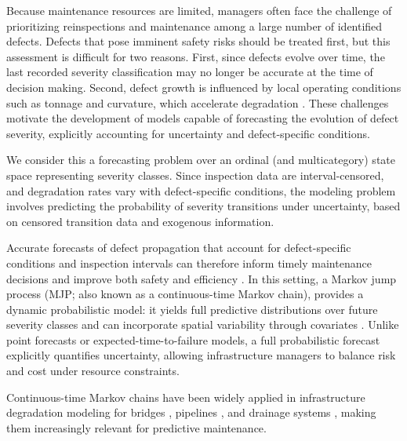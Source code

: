 Because maintenance resources are limited, managers often face the challenge of prioritizing reinspections and maintenance among a large number of identified defects.
Defects that pose imminent safety risks should be treated first, but this assessment is difficult for two reasons. 
First, since defects evolve over time, the last recorded severity classification may no longer be accurate at the time of decision making.
Second, defect growth is influenced by local operating conditions such as tonnage and curvature, which accelerate degradation \citep{bai2017a,Kumar2008HolisticSweden}.
These challenges motivate the development of models capable of forecasting the evolution of defect severity, explicitly accounting for uncertainty and defect-specific conditions.

We consider this a forecasting problem over an ordinal (and multicategory) state space representing severity classes. Since inspection data are interval-censored, and degradation rates vary with defect-specific conditions, the modeling problem involves predicting the probability of severity transitions under uncertainty, based on censored transition data and exogenous information.

Accurate forecasts of defect propagation that account for defect-specific conditions and inspection intervals can therefore inform timely maintenance decisions and improve both safety and efficiency \citep{Binder2023}. In this setting, a Markov jump process (MJP; also known as a continuous-time Markov chain), provides a dynamic probabilistic model: it yields full predictive distributions over future severity classes and can incorporate spatial variability through covariates \citep{bisgaard2024A}. Unlike point forecasts or expected-time-to-failure models, a full probabilistic forecast explicitly quantifies uncertainty, allowing infrastructure managers to balance risk and cost under resource constraints.

Continuous-time Markov chains have been widely applied in infrastructure degradation modeling for bridges \citep{Mizutani2023RegimeSwitching}, pipelines \citep{JimenezRoa2024Nonhomogeneous}, and drainage systems \citep{Wu2021ConditionPrediction}, making them increasingly relevant for predictive maintenance. %

